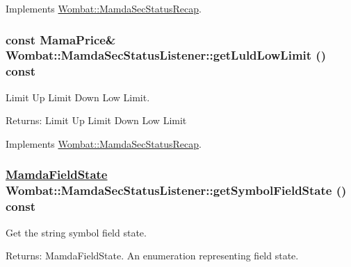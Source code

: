 Implements \hyperlink{classWombat_1_1MamdaSecStatusRecap_832c6a65be3a072fb3980f27661f3fd5}{Wombat::Mamda\-Sec\-Status\-Recap}.\hypertarget{classWombat_1_1MamdaSecStatusListener_9a2b08e93ceb9deb618edac1e71075f3}{
\subsubsection[getLuldLowLimit]{\setlength{\rightskip}{0pt plus 5cm}const Mama\-Price\& Wombat::Mamda\-Sec\-Status\-Listener::get\-Luld\-Low\-Limit () const}}
\label{classWombat_1_1MamdaSecStatusListener_9a2b08e93ceb9deb618edac1e71075f3}


Limit Up Limit Down Low Limit. 

\begin{Desc}
\item[Returns:]Limit Up Limit Down Low Limit \end{Desc}


Implements \hyperlink{classWombat_1_1MamdaSecStatusRecap_5c40a583386f3c02006e31381fd99b17}{Wombat::Mamda\-Sec\-Status\-Recap}.\hypertarget{classWombat_1_1MamdaSecStatusListener_a4642e50a6f7606ddf2eb510356468da}{
\subsubsection[getSymbolFieldState]{\setlength{\rightskip}{0pt plus 5cm}\hyperlink{namespaceWombat_93aac974f2ab713554fd12a1fa3b7d2a}{Mamda\-Field\-State} Wombat::Mamda\-Sec\-Status\-Listener::get\-Symbol\-Field\-State () const}}
\label{classWombat_1_1MamdaSecStatusListener_a4642e50a6f7606ddf2eb510356468da}


Get the string symbol field state. 

\begin{Desc}
\item[Returns:]Mamda\-Field\-State. An enumeration representing field state. \end{Desc}


